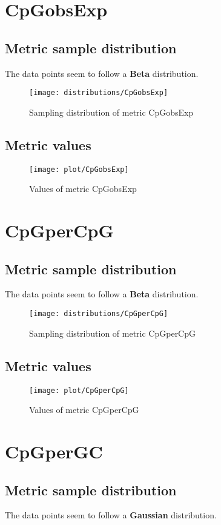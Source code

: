 \documentclass[\main/main.tex]{subfiles}
\begin{document}
\clearpage
\section{CpGobsExp}
\subsection{Metric sample distribution}
The data points seem to follow a \textbf{Beta} distribution.

\begin{figure}
  \texttt{[image: distributions/CpGobsExp]}
  \caption{Sampling distribution of metric CpGobsExp}
\end{figure}
\subsection{Metric values}
\begin{figure}
  \texttt{[image: plot/CpGobsExp]}
  \caption{Values of metric CpGobsExp}
\end{figure}

\clearpage
\section{CpGperCpG}
\subsection{Metric sample distribution}
The data points seem to follow a \textbf{Beta} distribution.
\begin{figure}
  \texttt{[image: distributions/CpGperCpG]}
  \caption{Sampling distribution of metric CpGperCpG}
\end{figure}
\subsection{Metric values}
\begin{figure}
  \texttt{[image: plot/CpGperCpG]}
  \caption{Values of metric CpGperCpG}
\end{figure}

\clearpage
\section{CpGperGC}
\subsection{Metric sample distribution}
The data points seem to follow a \textbf{Gaussian} distribution.
\end{document}
